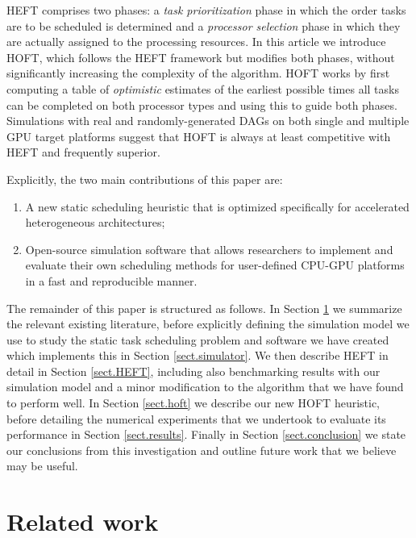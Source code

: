 \documentclass[runningheads]{llncs}
\begin{document}
HEFT comprises two phases: a {\em task prioritization} phase in which the order tasks are to be scheduled is determined and a {\em processor selection} phase in which they are actually assigned to the processing resources. In this article we introduce HOFT, which follows the HEFT framework but modifies both phases, without significantly increasing the complexity of the algorithm. HOFT works by first computing a table of {\em optimistic} estimates of the earliest possible times all tasks can be completed on both processor types and using this to guide both phases. Simulations with real and randomly-generated DAGs on both single and multiple GPU target platforms suggest that HOFT is always at least competitive with HEFT and frequently superior.          

Explicitly, the two main contributions of this paper are:
\begin{enumerate}	
	\item A new static scheduling heuristic that is optimized specifically for accelerated heterogeneous architectures;
	\item Open-source simulation software that allows researchers to implement and evaluate their own scheduling methods for user-defined CPU-GPU platforms in a fast and reproducible manner.
\end{enumerate} 
The remainder of this paper is structured as follows. In Section \ref{sect.lit_review} we summarize the relevant existing literature, before explicitly defining the simulation model we use to study the static task scheduling problem and software we have created which implements this in Section \ref{sect.simulator}. We then describe HEFT in detail in Section \ref{sect.HEFT}, including also benchmarking results with our simulation model and a minor modification to the algorithm that we have found to perform well. In Section \ref{sect.hoft} we describe our new HOFT heuristic, before detailing the numerical experiments that we undertook to evaluate its performance in Section \ref{sect.results}. Finally in Section \ref{sect.conclusion} we state our conclusions from this investigation and outline future work that we believe may be useful.
 
\section{Related work}
\label{sect.lit_review}
\end{document}
